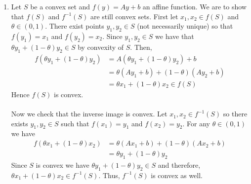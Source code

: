 \documentclass[11pt]{amsart}
\begin{document}
\begin{enumerate}
\item Let $S$ be a convex set and $f(y) = Ay+b$ an affine function.  We are to show that $f(S)$ and $f^{-1}(S)$ are still convex sets.  First let $x_1,x_2 \in f(S)$ and $\theta \in (0,1)$.  There exist points $y_1,y_2 \in S$ (not necessarily unique) so that $f(y_1) = x_1$ and $f(y_2) = x_2$.  Since $y_1,y_2 \in S$ we have that $\theta y_1 + (1-\theta)y_2 \in S$ by convexity of $S$.  Then,
\begin{align*}
f\left(\theta y_1 + (1-\theta)y_2 \right) &= A(\theta y_1 + (1-\theta)y_2) + b \\
&= \theta (Ay_1 + b) + (1 - \theta)(Ay_2 + b) \\
&= \theta x_1 + (1 - \theta)x_2 \in f(S)
\end{align*}
Hence $f(S)$ is convex.\\
\\
Now we check that the inverse image is convex.  Let $x_1,x_2 \in f^{-1}(S)$ so there exists $y_1,y_2 \in S$ such that $f(x_1) = y_1$ and $f(x_2) = y_2$.  For any $\theta \in (0,1)$ we have
\begin{align*}
f(\theta x_1 + (1-\theta)x_2) &= \theta (Ax_1 + b) + (1 - \theta)(Ax_2 + b)\\
&= \theta y_1 + (1 - \theta)y_2
\end{align*}
Since $S$ is convex we have $\theta y_1 + (1 - \theta)y_2 \in S$ and therefore, $\theta x_1 + (1-\theta)x_2 \in f^{-1}(S)$.  Thus, $f^{-1}(S)$ is convex as well.

\vspace{0.5in}



\end{enumerate}
\end{document}
